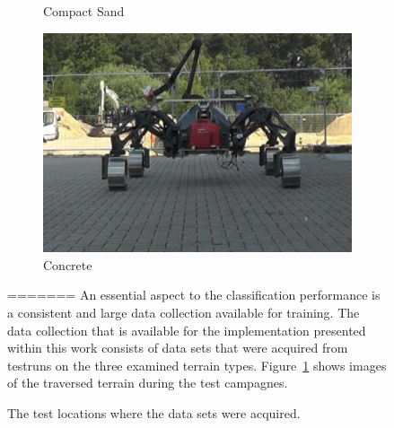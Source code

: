 \documentclass{article}
\begin{document}
\begin{figure}[!htb]
\begin{subfigure}[t]{0.3\textwidth}
        \caption{Compact Sand}
    \end{subfigure}
    \qquad
    \begin{subfigure}[t]{0.3\textwidth}
        \includegraphics[width=\textwidth]{../figures/concrete_v2.png}
        \caption{Concrete}
    \end{subfigure}
 \caption{The test locations where the data sets were acquired.}
 \label{fig:TestLocs}
=======
An essential aspect to the classification performance is a consistent and large data collection available for training. The data collection that is available for the implementation presented within this work
consists of data sets that were acquired from testruns on the three examined terrain types. Figure~\ref{fig:TestLocs} shows images of the traversed terrain during the test campagnes.


\end{figure}
\end{document}
